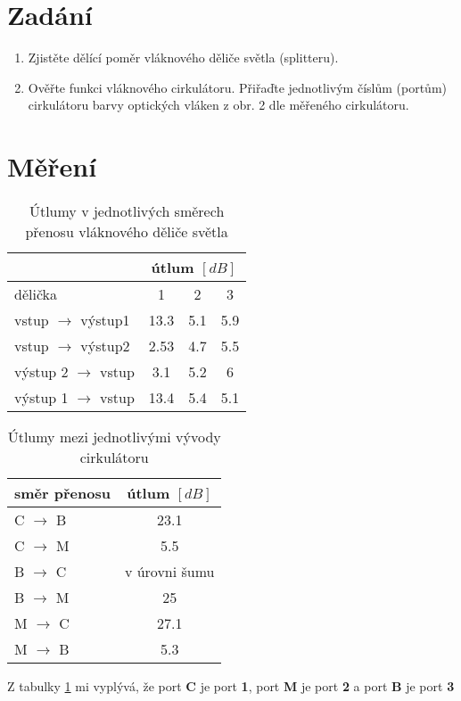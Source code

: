 \section{Zadání}

\begin{enumerate}
    \item Zjistěte dělící poměr vláknového děliče světla (splitteru).
    \item Ověřte funkci vláknového cirkulátoru. Přiřaďte jednotlivým číslům (portům) cirkulátoru barvy optických vláken z obr. 2 dle měřeného cirkulátoru. 
\end{enumerate}

\section{Měření}

\begin{table}[h]
    \centering
    \begin{tabular}{|l|c|c|c|}
        \hline
        & \multicolumn{3}{c|}{útlum \([dB]\)} \\ \hline
        dělička                      & 1    & 2   & 3   \\ \hline
        vstup $\rightarrow$ výstup1  & 13.3 & 5.1 & 5.9 \\ \hline
        vstup $\rightarrow$ výstup2  & 2.53 & 4.7 & 5.5 \\ \hline
        výstup 2 $\rightarrow$ vstup & 3.1  & 5.2 & 6   \\ \hline
        výstup 1 $\rightarrow$ vstup & 13.4 & 5.4 & 5.1 \\ \hline
    \end{tabular}
    \caption{Útlumy v jednotlivých směrech přenosu vláknového děliče světla}
\end{table}



\begin{table}[h]
    \centering
    \begin{tabular}{|l|c|}
    \hline
        směr přenosu      & útlum \([dB]\) \\ \hline
        C $\rightarrow$ B & 23.1           \\ \hline
        C $\rightarrow$ M & 5.5            \\ \hline
        B $\rightarrow$ C & v úrovni šumu  \\ \hline
        B $\rightarrow$ M & 25             \\ \hline
        M $\rightarrow$ C & 27.1           \\ \hline
        M $\rightarrow$ B & 5.3            \\ \hline
    \end{tabular}
    \caption{Útlumy mezi jednotlivými vývody cirkulátoru \label{tab-circuator}}
\end{table}

Z tabulky \ref{tab-circuator} mi vyplývá, že port {\bf C} je port {\bf 1}, port {\bf M} je port {\bf 2} a port {\bf B} je port {\bf 3}